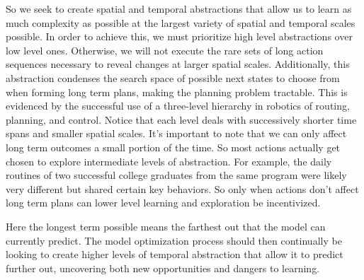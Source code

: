 \documentclass{article}
\begin{document}
So we seek to create spatial and temporal abstractions that allow us to learn as much complexity as possible at the largest variety of spatial and temporal scales possible. In order to achieve this, we must prioritize high level abstractions over low level ones. Otherwise, we will not execute the rare sets of long action sequences necessary to reveal changes at larger spatial scales. Additionally, this abstraction condenses the search space of possible next states \cite{BerliacHierachialRL2019} to choose from when forming long term plans, making the planning problem tractable. This is evidenced by the successful use of a three-level hierarchy in robotics \cite{gat1998three} of routing, planning, and control. Notice that each level deals with successively shorter time spans and smaller spatial scales. It's important to note that we can only affect long term outcomes a small portion of the time. So most actions actually get chosen to explore intermediate levels of abstraction. For example, the daily routines of two successful college graduates from the same program were likely very different but shared certain key behaviors. So only when actions don't affect long term plans can lower level learning and exploration be incentivized.

Here the longest term possible means the farthest out that the model can currently predict. The model optimization process should then continually \cite{stanley2005evolving} be looking to create higher levels of temporal abstraction that allow it to predict further out, uncovering both new opportunities and dangers to learning.
\end{document}

